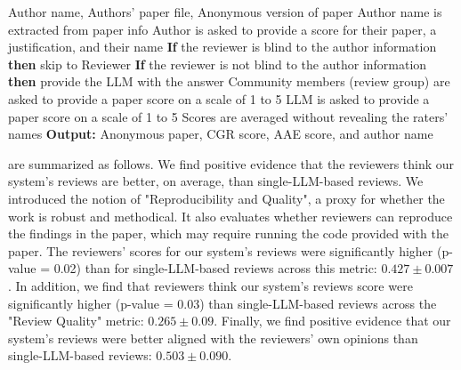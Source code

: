 \begin{algorithm}[htb]
	\caption{Author-Assisted-Evaluation (AAE) and Community-Guided Review (CGR) of a paper}
	\begin{algorithmic}[1]
		 Author name, Authors' paper file, Anonymous version of paper
		\STATE Author name is extracted from paper info
		\STATE Author is asked to provide a score for their paper, a justification, and their name
		\STATE \textbf{If} the reviewer is blind to the author information \textbf{then} skip to Reviewer
        \STATE \textbf{If} the reviewer is not blind to the author information \textbf{then} provide the LLM with the answer
        \STATE Community members (review group) are asked to provide a paper score on a scale of 1 to 5
        \STATE LLM is asked to provide a paper score on a scale of 1 to 5
        \STATE Scores are averaged without revealing the raters' names
		\STATE \textbf{Output:} Anonymous paper, CGR score, AAE score, and author name
	\end{algorithmic}
	\label{alg:total}
\end{algorithm}


 are summarized as follows. 
    We find positive evidence that the reviewers think our system's reviews are better, on average, than single-LLM-based reviews. We introduced the notion of "Reproducibility and Quality", a proxy for whether the work is robust and methodical. It also evaluates whether reviewers can reproduce the findings in the paper, which may require running the code provided with the paper.
    The reviewers' scores for our system's reviews were significantly higher (p-value = 0.02) than for single-LLM-based reviews across this metric: $0.427 \pm 0.007$.
    In addition, we find that reviewers think our system's reviews score were significantly higher (p-value = 0.03) than single-LLM-based reviews across the "Review Quality" metric: $0.265 \pm 0.09$.
    Finally, we find positive evidence that our system's reviews were better aligned with the reviewers' own opinions than single-LLM-based reviews: $0.503 \pm 0.090$.

